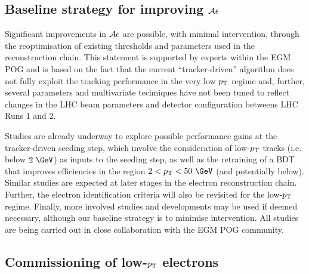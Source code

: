 \subsection{Baseline strategy for improving
  \texorpdfstring{$\mathcal{A}\epsilon$}{AxE}}
\label{sec:strategy}

Significant improvements in $\mathcal{A}\epsilon$ are possible, with minimal
intervention, through the reoptimisation of existing thresholds and
parameters used in the reconstruction chain. This statement is
supported by experts within the EGM POG and is based on the fact that
the current ``tracker-driven'' algorithm does not fully exploit the
tracking performance in the very low $p_\mathrm{T}$ regime and, further,
several parameters and multivariate techniques have not been tuned to
reflect changes in the LHC beam parameters and detector configuration
betweens LHC Runs 1 and 2. 

Studies are already underway to explore possible performance gains at
the tracker-driven seeding step, which involve the consideration of
low-$p_\mathrm{T}$ tracks (i.e. below $2~\GeV$) as inputs to the seeding step,
as well as the retraining of a BDT that improves efficiencies in the
region $2 < \pt < 50~\GeV$ (and potentially below). Similar studies
are expected at later stages in the electron reconstruction
chain. Further, the electron identification criteria will also be
revisited for the low-$p_\mathrm{T}$ regime. Finally, more involved studies and
developments may be used if deemed necessary, although our baseline
strategy is to minimise intervention. All studies are being carried
out in close collaboration with the EGM POG community.


\subsection{Commissioning of low-\texorpdfstring{$p_\mathrm{T}$}{pT} electrons}

